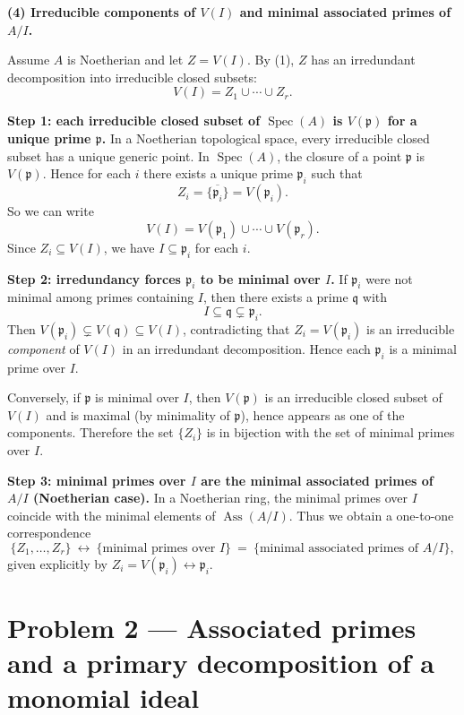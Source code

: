 \documentclass[12pt,a4paper]{article}
\newcommand{\Ass}{\operatorname{Ass}}
\DeclareMathOperator{\Spec}{Spec}
\theoremstyle{plain}
\theoremstyle{definition}      %
\begin{document}
	\bigskip
	\textbf{(4) Irreducible components of $V(I)$ and minimal associated primes of $A/I$.}
	
	Assume $A$ is Noetherian and let $Z=V(I)$.
	By (1), $Z$ has an irredundant decomposition into irreducible closed subsets:
	\[
	V(I)=Z_1\cup\cdots\cup Z_r.
	\]
	
	\medskip
	\textbf{Step 1: each irreducible closed subset of $\Spec(A)$ is $V(\mathfrak p)$ for a unique prime $\mathfrak p$.}
	In a Noetherian topological space, every irreducible closed subset has a unique generic point.
	In $\Spec(A)$, the closure of a point $\mathfrak p$ is $V(\mathfrak p)$.
	Hence for each $i$ there exists a unique prime $\mathfrak p_i$ such that
	\[
	Z_i=\overline{\{\mathfrak p_i\}}=V(\mathfrak p_i).
	\]
	So we can write
	\[
	V(I)=V(\mathfrak p_1)\cup\cdots\cup V(\mathfrak p_r).
	\]
	Since $Z_i\subseteq V(I)$, we have $I\subseteq \mathfrak p_i$ for each $i$.
	
	\medskip
	\textbf{Step 2: irredundancy forces $\mathfrak p_i$ to be minimal over $I$.}
	If $\mathfrak p_i$ were not minimal among primes containing $I$, then there exists a prime
	$\mathfrak q$ with
	\[
	I\subseteq \mathfrak q \subsetneq \mathfrak p_i.
	\]
	Then $V(\mathfrak p_i)\subsetneq V(\mathfrak q)\subseteq V(I)$, contradicting that $Z_i=V(\mathfrak p_i)$
	is an irreducible \emph{component} of $V(I)$ in an irredundant decomposition.
	Hence each $\mathfrak p_i$ is a minimal prime over $I$.
	
	Conversely, if $\mathfrak p$ is minimal over $I$, then $V(\mathfrak p)$ is an irreducible closed subset of $V(I)$
	and is maximal (by minimality of $\mathfrak p$), hence appears as one of the components.
	Therefore the set $\{Z_i\}$ is in bijection with the set of minimal primes over $I$.
	
	\medskip
	\textbf{Step 3: minimal primes over $I$ are the minimal associated primes of $A/I$ (Noetherian case).}
	In a Noetherian ring, the minimal primes over $I$ coincide with the minimal elements of $\Ass(A/I)$.
	Thus we obtain a one-to-one correspondence
	\[
	\{Z_1,\dots,Z_r\}
	\ \longleftrightarrow\
	\{\text{minimal primes over }I\}
	\ =\
	\{\text{minimal associated primes of }A/I\},
	\]
	given explicitly by $Z_i=V(\mathfrak p_i)\longleftrightarrow \mathfrak p_i$.
	
	
	\section*{Problem 2 --- Associated primes and a primary decomposition of a monomial ideal}
	
\end{document}
